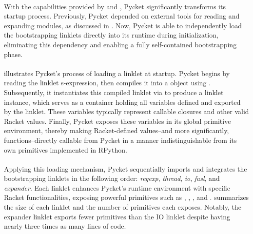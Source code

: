		\paragraph{}%
			With the capabilities provided by  and , Pycket significantly transforms its startup process. Previously, Pycket depended on external tools for reading and expanding modules, as discussed in . Now, Pycket is able to independently load the bootstrapping linklets directly into its runtime during initialization, eliminating this dependency and enabling a fully self-contained bootstrapping phase.


		\paragraph{}%
			 illustrates Pycket's process of loading a linklet at startup. Pycket begins by reading the linklet s-expression, then compiles it into a  object using . Subsequently, it instantiates this compiled linklet via  to produce a linklet instance, which serves as a container holding all variables defined and exported by the linklet. These variables typically represent callable closures and other valid Racket values. Finally, Pycket exposes these variables in its global primitive environment, thereby making Racket-defined values--and more significantly, functions--directly callable from Pycket in a manner indistinguishable from its own primitives implemented in RPython.

		\paragraph{}%
			Applying this loading mechanism, Pycket sequentially imports and integrates the bootstrapping linklets in the following order: \emph{regexp}, \emph{thread}, \emph{io}, \emph{fasl}, and \emph{expander}. Each linklet enhances Pycket's runtime environment with specific Racket functionalities, exposing powerful primitives such as , , , and .  summarizes the size of each linklet and the number of primitives each exposes. Notably, the expander linklet exports fewer primitives than the IO linklet despite having nearly three times as many lines of code.

